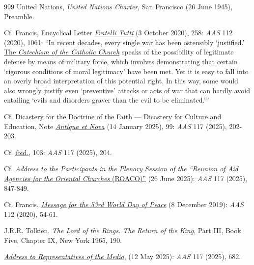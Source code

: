 \documentclass{article}
\begin{document}
\begin{thebibliography}{999}
 United Nations, \emph{United Nations Charter}, San Francisco (26 June 1945), Preamble.

 Cf. Francis, Encyclical Letter \href{https://www.vatican.va/content/francesco/en/encyclicals/documents/papa-francesco_20201003_enciclica-fratelli-tutti.html}{\emph{Fratelli Tutti}} (3 October 2020), 258: \emph{AAS} 112 (2020), 1061: ``In recent decades, every single war has been ostensibly `justified.' \href{https://www.vatican.va/archive/ENG0015/_INDEX.HTM}{The \emph{Catechism of the Catholic Church}} speaks of the possibility of legitimate defense by means of military force, which involves demonstrating that certain `rigorous conditions of moral legitimacy' have been met. Yet it is easy to fall into an overly broad interpretation of this potential right. In this way, some would also wrongly justify even `preventive' attacks or acts of war that can hardly avoid entailing `evils and disorders graver than the evil to be eliminated.'''

 Cf. Dicastery for the Doctrine of the Faith --- Dicastery for Culture and Education, Note \href{https://www.vatican.va/roman_curia/congregations/cfaith/documents/rc_ddf_doc_20250128_antiqua-et-nova_en.html}{\emph{Antiqua et Nova}} (14 January 2025), 99: \emph{AAS} 117 (2025), 202-203.

 Cf. \href{https://www.vatican.va/roman_curia/congregations/cfaith/documents/rc_ddf_doc_20250128_antiqua-et-nova_en.html}{ibid.}, 103: \emph{AAS} 117 (2025), 204.

 Cf. \href{https://www.vatican.va/content/leo-xiv/en/speeches/2025/june/documents/20250626-roaco.html}{\emph{Address to the Participants in the Plenary Session of the ``Reunion of Aid Agencies for the Oriental Churches} (ROACO)''} (26 June 2025): \emph{AAS} 117 (2025), 847-849.

 Cf. Francis, \href{https://www.vatican.va/content/francesco/en/messages/peace/documents/papa-francesco_20191208_messaggio-53giornatamondiale-pace2020.html}{\emph{Message for the 53rd World Day of Peace}} (8 December 2019): \emph{AAS} 112 (2020), 54-61.

 J.R.R. Tolkien, \emph{The Lord of the Rings. The Return of the King}, Part III, Book Five, Chapter IX, New York 1965, 190.

 \href{https://www.vatican.va/content/leo-xiv/en/speeches/2025/may/documents/20250512-media.html}{\emph{Address to Representatives of the Media}}, (12 May 2025): \emph{AAS} 117 (2025), 682.


\end{thebibliography}
\end{document}

